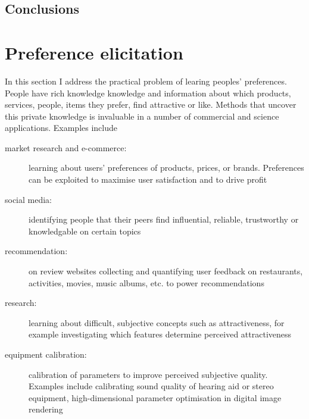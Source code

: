 \subsection{Conclusions}

\section{Preference elicitation}

In this section I address the practical problem of learing peoples' preferences. People have rich knowledge knowledge and information about which products, services, people, items they prefer, find attractive or like. Methods that uncover this private knowledge is invaluable in a number of commercial and science applications. Examples include
\begin{description}
	\item [market research and e-commerce:] learning about users' preferences of products, prices, or brands. Preferences can be exploited to maximise user satisfaction and to drive profit
	\item [social media:] identifying people that their peers find influential, reliable, trustworthy or knowledgable on certain topics
	\item [recommendation:] on review websites collecting and quantifying user feedback on restaurants, activities, movies, music albums, etc. to power recommendations
	\item [research:] learning about difficult, subjective concepts such as attractiveness, for example investigating which features determine perceived attractiveness
	\item [equipment calibration:] calibration of parameters to improve perceived subjective quality. Examples include calibrating sound quality of hearing aid or stereo equipment, high-dimensional parameter optimisation in digital image rendering
\end{description}


